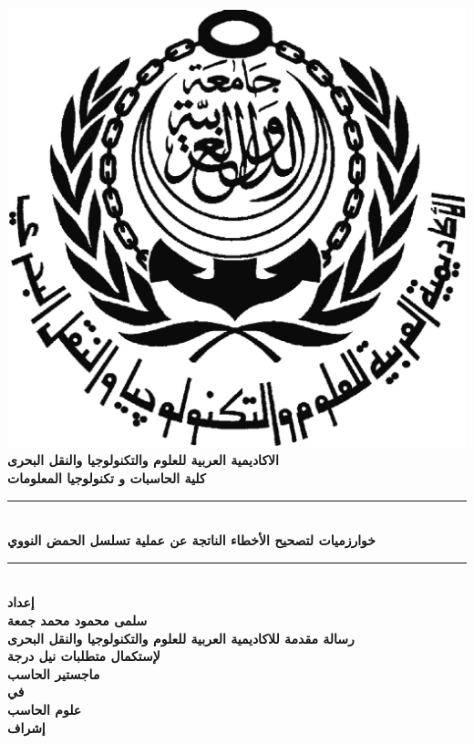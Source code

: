 \documentclass[12pt]{llncs}
\newcommand{\HRule}{\rule{\linewidth}{0.5mm}} %
\begin{document}
{\small
\begin{titlepage}
\center %
\includegraphics[scale=0.2]{./figs/aast}\\[0.7cm]
{\large \bfseries 
الاكاديمية العربية للعلوم والتكنولوجيا والنقل البحرى
}\\[0.7cm]
{\large \bfseries 
كلية الحاسبات و تكنولوجيا المعلومات
}\\[1cm]
\HRule \\[0.3cm]
{\LARGE \bfseries 
خوارزميات لتصحيح الأخطاء الناتجة عن عملية تسلسل الحمض النووي
}\\[0.2cm]
\HRule \\[0.3cm]
{\large \bfseries 
إعداد
}\\[0.3cm]
{\large \bfseries
سلمى محمود محمد جمعة
}\\[0.3cm]
{\bfseries 
رسالة مقدمة للاكاديمية العربية للعلوم والتكنولوجيا والنقل البحرى
}\\[0.2cm]
{\bfseries
لإستكمال متطلبات نيل درجة
}\\[0.2cm]
{\large \bfseries
 ماجستير الحاسب 
}\\[0.2cm]
{\large \bfseries
في
}\\[0.2cm]
{\large \bfseries
علوم الحاسب 
}\\[0.3cm]
{\large \bfseries 
إشراف
}\\[0.3cm]
\begin{minipage}{0.45\textwidth}

\end{minipage}
\end{titlepage}}
\end{document}
